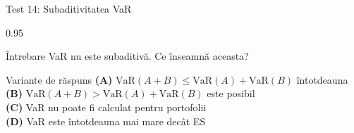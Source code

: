 \documentclass[9pt, aspectratio=169, t]{beamer}
\begin{document}
\begin{frame}{Test 14: Subaditivitatea VaR}
\begin{cminipage}{0.95\textwidth}
    \begin{alertblock}{Întrebare}
        VaR nu este subaditivă. Ce înseamnă aceasta?
    \end{alertblock}

    \vspace{0.5cm}
    \begin{block}{Variante de răspuns}
    \textcolor{MainBlue}{\textbf{(A)}} $\text{VaR}(A+B) \leq \text{VaR}(A) + \text{VaR}(B)$ întotdeauna\\[3pt]
    \textcolor{MainBlue}{\textbf{(B)}} $\text{VaR}(A+B) > \text{VaR}(A) + \text{VaR}(B)$ este posibil\\[3pt]
    \textcolor{MainBlue}{\textbf{(C)}} VaR nu poate fi calculat pentru portofolii\\[3pt]
    \textcolor{MainBlue}{\textbf{(D)}} VaR este întotdeauna mai mare decât ES
    \end{block}
\end{cminipage}
\end{frame}
\end{document}
